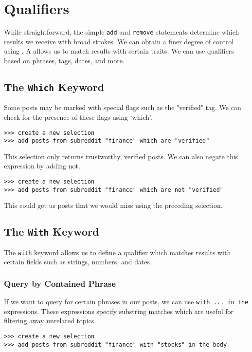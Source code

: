 \section{Qualifiers}
While straightforward, the simple \texttt{add} and \texttt{remove} statements determine which results we receive with broad strokes.
We can obtain a finer degree of control using . A  allows us to match results with certain traits.
We can use qualifiers based on phrases, tags, dates, and more.



\subsection{The \texttt{Which} Keyword}
Some posts may be marked with special flags such as the "verified" tag. We can check for the presence of these flags using ‘which’.
\newline\begin{minipage}{\linewidth}\begin{lstlisting}
>>> create a new selection
>>> add posts from subreddit "finance" which are "verified"
\end{lstlisting}\end{minipage}

This selection only returns trustworthy, verified posts. We can also negate this expression by adding not.
\newline\begin{minipage}{\linewidth}\begin{lstlisting}
>>> create a new selection
>>> add posts from subreddit "finance" which are not "verified"
\end{lstlisting}\end{minipage}

This could get us posts that we would miss using the preceding selection.



\subsection{The \texttt{With} Keyword}
The \texttt{with} keyword allows us to define a qualifier which matches results with certain fields such as strings, numbers, and dates.

\subsubsection{Query by Contained Phrase}
If we want to query for certain phrases in our posts, we can use \texttt{with ... in the} expressions. These expressions specify substring matches which are useful for filtering away unrelated topics.
\newline\begin{minipage}{\linewidth}\begin{lstlisting}
>>> create a new selection
>>> add posts from subreddit "finance" with "stocks" in the body
\end{lstlisting}\end{minipage}

